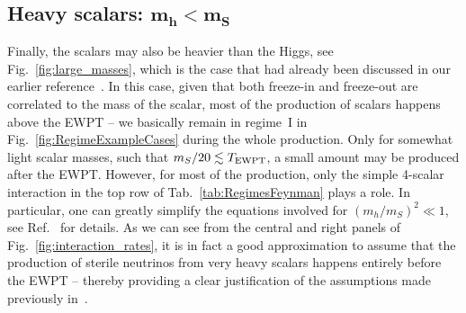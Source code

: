\subsection{\label{sec:Results_large}Heavy scalars: $\boldsymbol{m_h < m_S}$}

Finally, the scalars may also be heavier than the Higgs, see Fig.~\ref{fig:large_masses}, which is the case that had already been discussed in our earlier reference~\cite{Merle:2015oja}. In this case, given that both freeze-in and freeze-out are correlated to the mass of the scalar, most of the production of scalars happens above the EWPT -- we basically remain in regime~I in Fig.~\ref{fig:RegimeExampleCases} during the whole production. Only for somewhat light scalar masses, such that $m_S/20 \lesssim T_{\rm EWPT}$, a small amount may be produced after the EWPT. However, for most of the production, only the simple 4-scalar interaction in the top row of Tab.~\ref{tab:RegimesFeynman} plays a role. In particular, one can greatly simplify the equations involved for $(m_h/m_S)^2 \ll 1$, see Ref.~\cite{Merle:2015oja} for details. As we can see from the central and right panels of Fig.~\ref{fig:interaction_rates}, it is in fact a good approximation to assume that the production of sterile neutrinos from very heavy scalars happens entirely before the EWPT -- thereby providing a clear justification of the assumptions made previously in~\cite{Merle:2015oja}.

